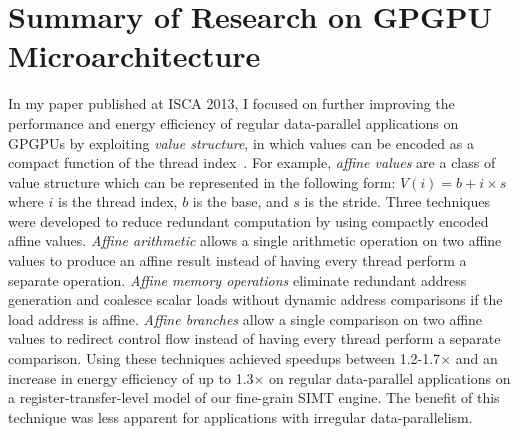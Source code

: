 
\section{Summary of Research on GPGPU Microarchitecture}
\label{sec-background}

In my paper published at ISCA 2013, I focused on further improving the
performance and energy efficiency of regular data-parallel
applications on GPGPUs by exploiting \emph{value structure}, in which
values can be encoded as a compact function of the thread
index~\cite{kim-simt-vstruct-isca2013}.  For example, \emph{affine
  values} are a class of value structure which can be represented in the
following form: $V(i) = b + i \times s$ where $i$ is the thread index,
$b$ is the base, and $s$ is the stride.  Three techniques were developed
to reduce redundant computation by using compactly encoded affine values.
\emph{Affine arithmetic} allows a single arithmetic operation on two
affine values to produce an affine result instead of having every thread
perform a separate operation. \emph{Affine memory operations} eliminate
redundant address generation and coalesce scalar loads without dynamic
address comparisons if the load address is affine. \emph{Affine branches}
allow a single comparison on two affine values to redirect control flow
instead of having every thread perform a separate comparison.  Using
these techniques achieved speedups between 1.2-1.7$\times$ and an
increase in energy efficiency of up to 1.3$\times$ on regular
data-parallel applications on a register-transfer-level model of our
fine-grain SIMT engine. The benefit of this technique was less apparent
for applications with irregular data-parallelism.

